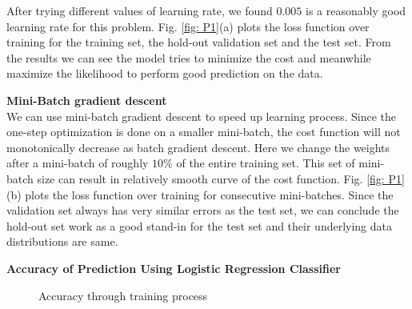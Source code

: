 \documentclass{article} %
\begin{document}
After trying different values of learning rate, we found $0.005$ is a reasonably good learning rate for this problem. Fig. \ref{fig: P1}(a) plots the  loss function over training for the training set, the hold-out validation set and the test set. From the results we can see the model tries to minimize the cost and meanwhile maximize the likelihood to perform good prediction on the data.

\textbf{Mini-Batch gradient descent}\\
We can use mini-batch gradient descent to speed up learning process. Since the one-step optimization is done on a smaller mini-batch, the cost function will not monotonically decrease as batch gradient descent. Here we change the weights after a mini-batch of roughly $10\%$ of the entire training set. This set of mini-batch size can result in relatively smooth curve of the cost function. Fig. \ref{fig: P1}(b) plots the loss function over training for consecutive mini-batches. Since the validation set always has very similar errors as the test set, we can conclude the hold-out set work as a good stand-in for the test set and their underlying data distributions are same.

\textbf{Accuracy of Prediction Using Logistic Regression Classifier}\\

\begin{figure}%
	\centering
	\qquad
	\caption{Accuracy through training process}%
	\label{fig:P3}%
\end{figure}
\end{document}
